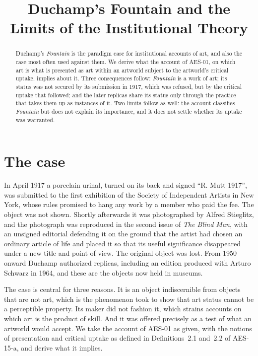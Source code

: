 \documentclass{situationist-preprint}
\title{Duchamp's Fountain and the Limits of the Institutional Theory}
\begin{document}
\maketitle

\begin{abstract}
Duchamp's \emph{Fountain} is the paradigm case for institutional accounts of art, and also the case most often used against them. We derive what the account of AES-01, on which art is what is presented as art within an artworld subject to the artworld's critical uptake, implies about it. Three consequences follow: \emph{Fountain} is a work of art; its status was not secured by its submission in 1917, which was refused, but by the critical uptake that followed; and the later replicas share its status only through the practice that takes them up as instances of it. Two limits follow as well: the account classifies \emph{Fountain} but does not explain its importance, and it does not settle whether its uptake was warranted.
\end{abstract}

\section{The case}

In April 1917 a porcelain urinal, turned on its back and signed \enquote{R. Mutt 1917}, was submitted to the first exhibition of the Society of Independent Artists in New York, whose rules promised to hang any work by a member who paid the fee. The object was not shown. Shortly afterwards it was photographed by Alfred Stieglitz, and the photograph was reproduced in the second issue of \emph{The Blind Man}, with an unsigned editorial defending it on the ground that the artist had chosen an ordinary article of life and placed it so that its useful significance disappeared under a new title and point of view. The original object was lost. From 1950 onward Duchamp authorized replicas, including an edition produced with Arturo Schwarz in 1964, and these are the objects now held in museums.

The case is central for three reasons. It is an object indiscernible from objects that are not art, which is the phenomenon \citet{Danto1964,Danto1981} took to show that art status cannot be a perceptible property. Its maker did not fashion it, which strains accounts on which art is the product of skill. And it was offered precisely as a test of what an artworld would accept. We take the account of AES-01 as given, with the notions of presentation and critical uptake as defined in Definitions~2.1 and~2.2 of AES-15-a, and derive what it implies.
\end{document}
